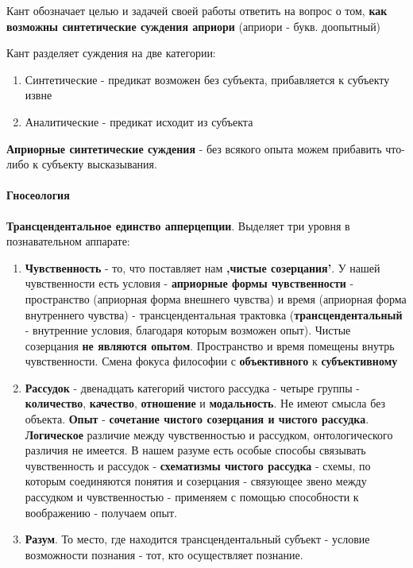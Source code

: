 \documentclass{article}
\begin{document}
\begin{flushleft}
Кант обозначает целью и задачей своей работы ответить на вопрос о том, \textbf{как возможны синтетические суждения априори} (априори - букв. доопытный)

Кант разделяет суждения на две категории:

\begin{enumerate}
    \item Синтетические - предикат возможен без субъекта, прибавляется к субъекту извне
    \item Аналитические - предикат исходит из субъекта
\end{enumerate}

\textbf{Априорные синтетические суждения} - без всякого опыта можем прибавить что-либо к субъекту высказывания.

\paragraph{Гносеология} \textbf{Трансцендентальное единство апперцепции}. Выделяет три уровня в познавательном аппарате:

\begin{enumerate}
    \item \textbf{Чувственность} - то, что поставляет нам \textbf{,чистые созерцания'}. У нашей чувственности есть условия - \textbf{априорные формы чувственности} - пространство (априорная форма внешнего чувства) и время (априорная форма внутреннего чувства) - трансцендентальная трактовка (\textbf{трансцендентальный} - внутренние условия, благодаря которым возможен опыт). Чистые созерцания \textbf{не являются опытом}. Пространство и время помещены внутрь чувственности. Смена фокуса философии с \textbf{объективного} к \textbf{субъективному}
    \item \textbf{Рассудок} - двенадцать категорий чистого рассудка - четыре группы - \textbf{количество}, \textbf{качество}, \textbf{отношение} и \textbf{модальность}. Не имеют смысла без объекта. \textbf{Опыт} - \textbf{сочетание чистого созерцания и чистого рассудка}. \textbf{Логическое} различие между чувственностью и рассудком, онтологического различия не имеется. В нашем разуме есть особые способы связывать чувственность и рассудок - \textbf{схематизмы чистого рассудка} - схемы, по которым соединяются понятия и созерцания - связующее звено между рассудком и чувственностью - применяем с помощью способности к воображению - получаем опыт.
    \item \textbf{Разум}. То место, где находится трансцендентальный субъект - условие возможности познания - тот, кто осуществляет познание.
\end{enumerate}


\end{flushleft}
\end{document}
